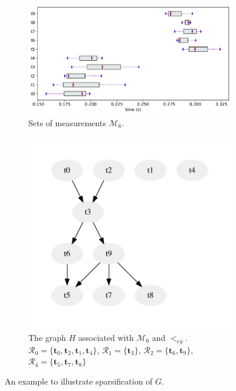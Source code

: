 \documentclass[acmsmall,screen, review]{acmart}
\begin{document}
\begin{figure}[h!]
	\centering
	\begin{subfigure}{0.7\textwidth}
		\centering
		\includegraphics[width=\textwidth]{fig/ch3/hasse-eg-2}
		\caption{Sets of measurements $\mathcal{M}_6$. }
		\label{fig3:hasse-eg-2}
	\end{subfigure}
	\hfill
	\begin{subfigure}{0.5\textwidth}
		\centering
		\includegraphics[width=\textwidth]{fig/ch3/hasse-eg-2-dfg}
		\caption{The graph $H$ associated with $\mathcal{M}_6$ and $<_{eg}$.\\$\mathcal{R}_0 = \{\mathbf{t}_0, \mathbf{t}_2, \mathbf{t}_1, \mathbf{t}_4\}$, $\mathcal{R}_1 = \{\mathbf{t}_3\}$, $\mathcal{R}_2 = \{\mathbf{t}_6, \mathbf{t}_9\}$, $\mathcal{R}_4 = \{\mathbf{t}_5, \mathbf{t}_7, \mathbf{t}_8\}$}
		\label{fig3:hasse-eg-2-dfg}
	\end{subfigure}
	\caption{An example to illustrate sparsification of $G$.  }
	\label{fig3:hasse-eg2}
\end{figure}
\end{document}
